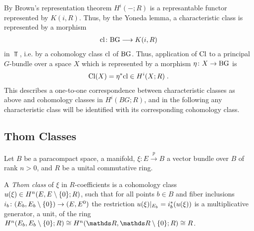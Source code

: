 \begin{Rem}
  By Brown's representation theorem %
  $H^i(-;R)$ is a represantable functor represented by $K(i,R)$.
  Thus, by the Yoneda lemma, a characteristic class is
  represented by a morphism
  \begin{gather*}
    \mathrm{cl}\colon \mathrm{BG} \longrightarrow K(i, R)
  \end{gather*}
  in $\Top$, i.e. by a cohomology class $\mathrm{cl}$ of $\mathrm{BG}$.
  Thus, application of $\mathrm{Cl}$ to a principal $G$-bundle over a
  space $X$ which is represented by a morphism $\eta\colon X\to\mathrm{BG}$ %
  is
  \begin{gather*}
    \mathrm{Cl}(X) = {\eta}^* \mathrm{cl} \in H^i(X;R)
    \;.
  \end{gather*}
  This describes a one-to-one correspondence between
  characteristic classes as above and cohomology classes in
  $H^i(BG;R)$, and in the following any characteristic class will be
  identified with its corresponding cohomology class.
\end{Rem}

\begin{Rem}
\end{Rem}

\subsection{Thom Classes}
Let $B$ be a paracompact space, \forexample a manifold,
$\xi\colon E\xrightarrow{p} B$ a vector bundle over $B$ of rank $n>0$,
and $R$ be a unital commutative ring.
\begin{Def}
  A \emph{Thom class} of $\xi$ in $R$-coefficients is a
  cohomology class $u(\xi)\in H^n(E, {E}\setminus\{0\}; R)$,
  such that for all points $b\in B$ and fiber inclusions
  $i_b\colon (E_b, {E_b}\setminus\{0\}) \to (E, {E}^0)$
  the restriction $u(\xi)|_{E_b} = {i}^*_b (u(\xi))$ is a
  multiplicative generator,
  \idest a unit, %
  of the ring
  $H^n(\spherepair{E_b};R)\cong H^n(\spherepair{\R}; R)\cong R$.
\end{Def}

